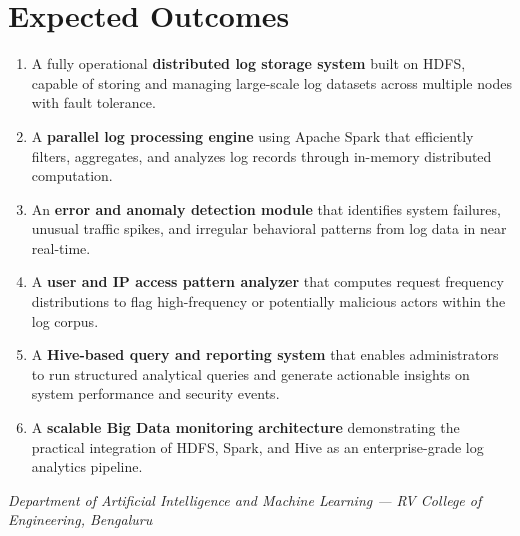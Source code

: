 \documentclass[12pt, a4paper]{article}
\begin{document}
\section*{Expected Outcomes}
\begin{enumerate}[label=\textbf{\arabic*.}]
    \item A fully operational \textbf{distributed log storage system} built on HDFS, capable of storing and managing large-scale log datasets across multiple nodes with fault tolerance.
    \item A \textbf{parallel log processing engine} using Apache Spark that efficiently filters, aggregates, and analyzes log records through in-memory distributed computation.
    \item An \textbf{error and anomaly detection module} that identifies system failures, unusual traffic spikes, and irregular behavioral patterns from log data in near real-time.
    \item A \textbf{user and IP access pattern analyzer} that computes request frequency distributions to flag high-frequency or potentially malicious actors within the log corpus.
    \item A \textbf{Hive-based query and reporting system} that enables administrators to run structured analytical queries and generate actionable insights on system performance and security events.
    \item A \textbf{scalable Big Data monitoring architecture} demonstrating the practical integration of HDFS, Spark, and Hive as an enterprise-grade log analytics pipeline.
\end{enumerate}

\vspace{0.5cm}
\noindent\textit{Department of Artificial Intelligence and Machine Learning --- RV College of Engineering, Bengaluru}
\end{document}
